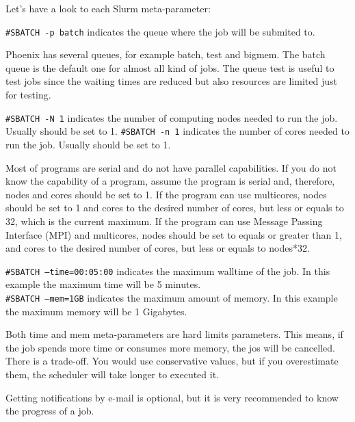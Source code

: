 Let's have a look to each Slurm meta-parameter:

\texttt{\#SBATCH -p batch} indicates the queue where the job will be submited to. 

Phoenix has several queues, for example batch, test and bigmem. The batch queue is the default one for almost all kind of jobs.
The queue test is useful to test jobs since the waiting times are reduced but also resources are limited just for testing.

\begin{information}
	\texttt{\#SBATCH -N 1} indicates the number of computing nodes needed to run the job. Usually should be set to 1.
	\texttt{\#SBATCH -n 1} indicates the number of cores needed to run the job. Usually should be set to 1.
\end{information}

\begin{warning}
    Most of programs are serial and do not have parallel capabilities. If you do not know the capability of a program, assume the program is serial and, therefore, nodes and cores should be set to 1.
    If the program can use multicores, nodes should be set to 1 and cores to the desired number of cores, but less or equals to 32, which is the current maximum.
    If the program can use Message Passing Interface (MPI) and multicores, nodes should be set to equals or greater than 1, and cores to the desired number of cores, but less or equals to nodes*32.
\end{warning}

\begin{information}
	\texttt{\#SBATCH --time=00:05:00} indicates the maximum walltime of the job. In this example the maximum time will be 5 minutes. \\
	\texttt{\#SBATCH --mem=1GB} indicates the maximum amount of memory. In this example the maximum memory will be 1 Gigabytes.
\end{information}

\begin{warning}
	Both time and mem meta-parameters are hard limits parameters. This means, if the job spends more time or consumes more memory, the jos will be cancelled.
	There is a trade-off. You would use conservative values, but if you overestimate them, the scheduler will take longer to executed it.
\end{warning}

Getting notifications by e-mail is optional, but it is very recommended to know the progress of a job.

